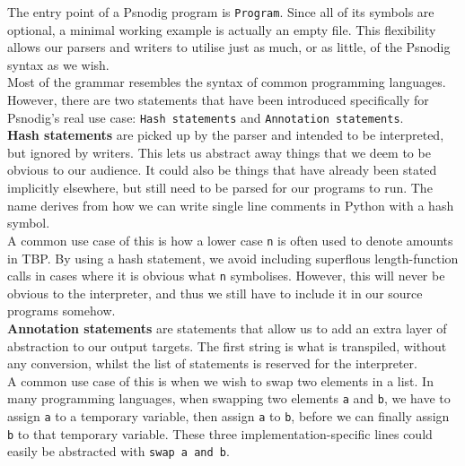 
The entry point of a Psnodig program is \texttt{Program}. Since all of its symbols are optional, a minimal working example is actually an empty file. This flexibility allows our parsers and writers to utilise just as much, or as little, of the Psnodig syntax as we wish. \\

Most of the grammar resembles the syntax of common programming languages. However, there are two statements that have been introduced specifically for Psnodig's real use case: \texttt{Hash statements} and \texttt{Annotation statements}. \\

\textbf{Hash statements} are picked up by the parser and intended to be interpreted, but ignored by writers. This lets us abstract away things that we deem to be obvious to our audience. It could also be things that have already been stated implicitly elsewhere, but still need to be parsed for our programs to run. The name derives from how we can write single line comments in Python with a hash symbol. \\

A common use case of this is how a lower case \texttt{n} is often used to denote amounts in TBP. By using a hash statement, we avoid including superflous length-function calls in cases where it is obvious what \texttt{n} symbolises. However, this will never be obvious to the interpreter, and thus we still have to include it in our source programs somehow. \\

\textbf{Annotation statements} are statements that allow us to add an extra layer of abstraction to our output targets. The first string is what is transpiled, without any conversion, whilst the list of statements is reserved for the interpreter. \\

A common use case of this is when we wish to swap two elements in a list. In many programming languages, when swapping two elements \texttt{a} and \texttt{b}, we have to assign \texttt{a} to a temporary variable, then assign \texttt{a} to \texttt{b}, before we can finally assign \texttt{b} to that temporary variable. These three implementation-specific lines could easily be abstracted with \texttt{swap a and b}. \\


